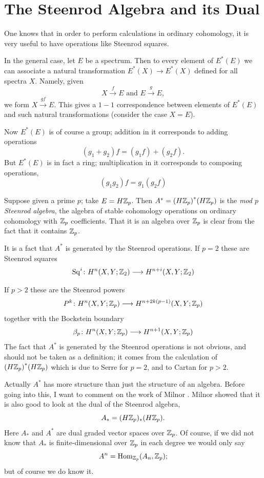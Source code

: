 \documentclass[../main]{subfiles}
\begin{document}
\chapter{The Steenrod Algebra and its Dual}
\label{sec:p3c12}
One knows that in order to perform calculations in ordinary cohomology, it is very useful to have operations like Steenrod squares.

In the general case, let $E$ be a spectrum. Then to every element of $E^\ast(E)$ we can associate a natural transformation $E^\ast(X)\longrightarrow E^\ast(X)$ defined for all spectra $X$. Namely, given
\[ X\overset f\longrightarrow E \text{ and } E\overset g\longrightarrow E, \]
we form $X\overset{gf}\longrightarrow E$. This gives a $1-1$ correspondence between elements of $E^\ast(E)$ and such natural transformations (consider the case $X=E$).

Now $E^\ast(E)$ is of course a group; addition in it corresponds to adding operations
\[ (g_1+g_2)f = (g_1f) + (g_2f). \]
But $E^\ast(E)$ is in fact a ring; multiplication in it %
corresponds to composing operations,
\[ (g_1g_2)f = g_1(g_2f) \]

\begin{examples}

Suppose given a prime $p$; take $E=H\mathbb{Z}_p$. Then $A^\ast={(H\mathbb{Z}_p)}^\ast(H\mathbb{Z}_p)$ is the \emph{mod $p$ Steenrod algebra}, the algebra of stable cohomology operations on ordinary cohomology with $\mathbb{Z}_p$ coefficients. That it is an algebra over $\mathbb{Z}_p$ is clear from the fact that it contains $\mathbb{Z}_p$.

\end{examples} %

It is a fact that $A^\ast$ is generated by the Steenrod operations. If $p=2$ these are Steenrod squares
\[ \mathrm{Sq}^i\colon H^n(X, Y; \mathbb{Z}_2) \longrightarrow H^{n+i}(X, Y; \mathbb{Z}_2) \]

If $p>2$ these are the Steenrod powers
\[ P^k\colon H^n(X, Y; \mathbb{Z}_p) \longrightarrow H^{n+2k(p-1)}(X, Y;\mathbb{Z}_p) \]
together with the Bockstein boundary
\[ \beta_p\colon H^n(X,Y;\mathbb{Z}_p)\longrightarrow H^{n+1}(X,Y;\mathbb{Z}_p) \]
The fact that $A^\ast$ is generated by the Steenrod operations is not obvious, and should not be taken as a definition; it comes from the calculation of ${(H\mathbb{Z}_p)}^\ast(H\mathbb{Z}_p)$ which is due to Serre for $p=2$, and to Cartan for $p>2$.

Actually $A^\ast$ has more structure than just the structure of an algebra. Before going into this, I want to comment on the work of Milnor \cite{milnor}. Milnor showed that it is also good to look at the dual of the Steenrod algebra,
\[ A_\ast=(H\mathbb{Z}_p)_\ast(H\mathbb{Z}_p). \]
Here $A_\ast$ and $A^\ast$ are dual graded vector spaces over $\mathbb{Z}_p$. Of course, if we did not know that $A_\ast$ is finite-dimensional over $\mathbb{Z}_p$ in each degree we would only say
\[ A^n=\mathrm{Hom}_{\mathbb{Z}_p}(A_n,\mathbb{Z}_p); \]
but of course we do know it.
\end{document}

